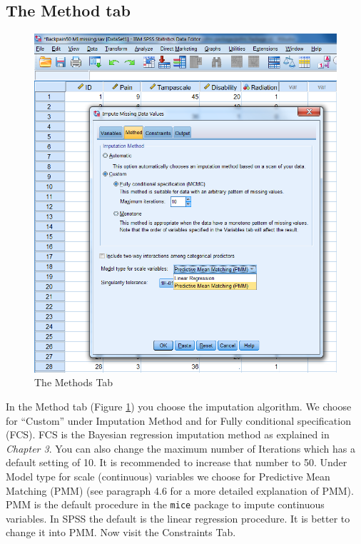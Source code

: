 \documentclass[
]{book}
\begin{document}
\hypertarget{the-method-tab}{%
\subsection{The Method tab}\label{the-method-tab}}

\begin{figure}

{\centering \includegraphics[width=0.9\linewidth]{images/fig4.7} 

}

\caption{The Methods Tab}\label{fig:fig4-7}
\end{figure}

In the Method tab (Figure \ref{fig:fig4-7}) you choose the imputation algorithm. We choose for ``Custom'' under Imputation Method and for Fully conditional specification (FCS). FCS is the Bayesian regression imputation method as explained in \emph{Chapter 3}. You can also change the maximum number of Iterations which has a default setting of 10. It is recommended to increase that number to 50. Under Model type for scale (continuous) variables we choose for Predictive Mean Matching (PMM) (see paragraph 4.6 for a more detailed explanation of PMM). PMM is the default procedure in the \texttt{mice} package to impute continuous variables. In SPSS the default is the linear regression procedure. It is better to change it into PMM. Now visit the Constraints Tab.
\end{document}
